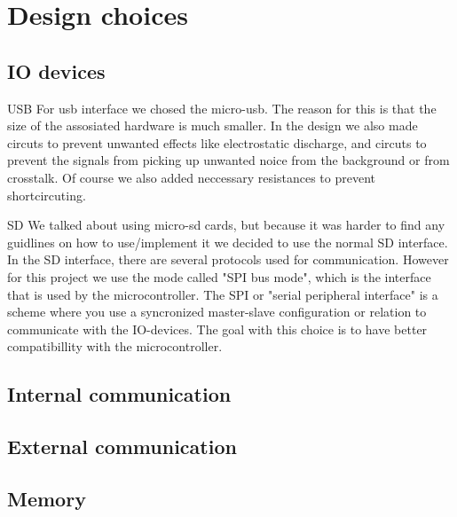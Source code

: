 \section {Design choices}

\subsection{IO devices} \label{pcb:design-choices:ss:IO_devices}
USB
For usb interface we chosed the micro-usb. The reason for this is that the size of the assosiated hardware is much smaller.  In the design we also made circuts to prevent unwanted effects like electrostatic discharge, and circuts to prevent the signals from picking up unwanted noice from the background or from crosstalk. Of course we also added neccessary resistances to prevent shortcircuting.

SD
We talked about using micro-sd cards, but because it was harder to find any guidlines on how to use/implement it we decided to use the normal SD interface. In the SD interface, there are several protocols used for communication. However for this project we use the mode called "SPI bus mode", which is the interface that is used by the microcontroller.  The SPI or "serial peripheral interface" is a scheme where you use a syncronized master-slave configuration or relation to communicate with the IO-devices. The goal with this choice is to have better compatibillity with the microcontroller.

\subsection{Internal communication} \label{pcb:design-choices:ss:internal_communication}

\subsection{External communication} \label{pcb:design-choices:ss:external_communincation}

\subsection{Memory} \label{pcb:design-choices:ss:memory}

